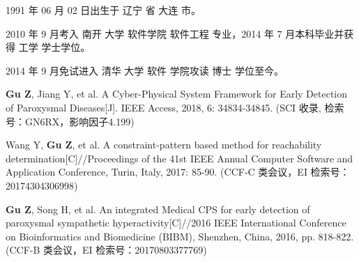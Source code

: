 \begin{resume}


  1991 年 06 月 02 日出生于 辽宁 省 大连 市。

  2010 年 9 月考入 南开 大学 软件学院  软件工程 专业，2014 年 7 月本科毕业并获得 工学 学士学位。

  2014 年 9 月免试进入 清华 大学 软件 学院攻读 博士 学位至今。


  \begin{publications}
    \item \textbf{Gu Z}, Jiang Y, et al. A Cyber-Physical System Framework for Early Detection of Paroxysmal Diseases[J]. IEEE Access, 2018, 6: 34834-34845. (SCI 收录, 检索号：GN6RX，影响因子4.199)
    \item Wang Y, \textbf{Gu Z}, et al. A constraint-pattern based method for reachability determination[C]//Proceedings of the 41st IEEE Annual Computer Software and Application Conference, Turin, Italy, 2017: 85-90. (CCF-C 类会议，EI 检索号：20174304306998)
    \item \textbf{Gu Z}, Song H, et al. An integrated Medical CPS for early detection of paroxysmal sympathetic hyperactivity[C]//2016 IEEE International Conference on Bioinformatics and Biomedicine (BIBM), Shenzhen, China, 2016, pp. 818-822. (CCF-B 类会议，EI 检索号：20170803377769)
  \end{publications}


\end{resume}
